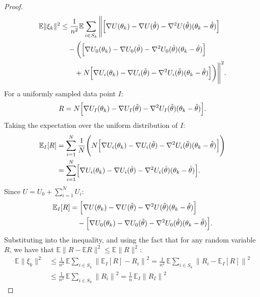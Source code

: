 \begin{proof}
\nopagebreak[4]
\begin{align*}
\begin{aligned}
\mathbb{E}\|\xi_k\|^2 &\leq \frac{1}{n^2} \mathbb{E} \sum_{i \in S_k} \Bigg\| \Bigl[\nabla U(\theta_k) - \nabla U(\hat\theta) - \nabla^2 U(\hat\theta)(\theta_k - \hat\theta)\Bigr] \\
&\quad - \biggl( \Bigl[\nabla U_0(\theta_k) - \nabla U_0(\hat\theta) - \nabla^2 U_0(\hat\theta)(\theta_k - \hat\theta)\Bigr] \\ &\quad \quad + N\Bigl[\nabla U_i(\theta_k) - \nabla U_i(\hat\theta) - \nabla^2 U_i(\hat\theta)(\theta_k - \hat\theta)\Bigr] \biggr) \Bigg\|^2.
\end{aligned}
\end{align*}
For a uniformly sampled data point $I$:
$$
    R = N \Bigl[ \nabla U_I(\theta_k) - \nabla U_I(\hat\theta) 
    - \nabla^2 U_I(\hat\theta)(\theta_k - \hat\theta) \Bigr].
$$
Taking the expectation over the uniform distribution of $I$:
\begin{align*}
    \mathbb{E}_I[R] 
    &= \sum_{i=1}^N \frac{1}{N} \Bigg( N \Bigl[ \nabla U_i(\theta_k) 
        - \nabla U_i(\hat\theta) 
        - \nabla^2 U_i(\hat\theta)(\theta_k - \hat\theta) \Bigr] \Bigg) \\
    &= \sum_{i=1}^N \Bigl[ \nabla U_i(\theta_k) 
        - \nabla U_i(\hat\theta) 
        - \nabla^2 U_i(\hat\theta)(\theta_k - \hat\theta) \Bigr].
\end{align*}
Since $U = U_0 + \sum_{i=1}^N U_i$:
\begin{align*}
    \mathbb{E}_I[R] 
    &= \Bigl[ \nabla U(\theta_k) - \nabla U(\hat\theta) 
        - \nabla^2 U(\hat\theta)(\theta_k - \hat\theta) 
        \Bigr] \\
&\quad - \Bigl[ \nabla U_0(\theta_k) - \nabla U_0(\hat\theta) 
        - \nabla^2 U_0(\hat\theta)(\theta_k - \hat\theta) 
        \Bigr].
\end{align*}
Substituting into the inequality, and using the fact that for any random variable $R$, 
we have that $\mathbb{E}\|R - \mathbb{E}R\|^2 \leq \mathbb{E}\|R\|^2$:
\begin{align*}
\mathbb{E}\|\xi_k\|^2 
&\leq \frac{1}{n^2}\,\mathbb{E}\sum_{i \in S_k}
    \left\|\mathbb{E}_I[R] - R_i\right\|^2 = \frac{1}{n^2}\,\mathbb{E}\sum_{i \in S_k}
    \left\|R_i - \mathbb{E}_I[R]\right\|^2 \\
&\leq \frac{1}{n^2}\,\mathbb{E}\sum_{i \in S_k}
    \left\|R_i\right\|^2 = \frac{1}{n}\,\mathbb{E}_I\left\|R_I\right\|^2
\end{align*}
 


\end{proof}
